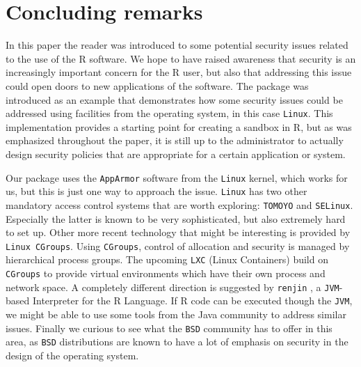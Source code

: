 \documentclass[article]{jss}
\newcommand{\R}{\textsf{R}\xspace}
\newcommand{\Java}{\textsf{Java}\xspace}
\newcommand{\AppArmor}{\texttt{AppArmor}\xspace}
\newcommand{\RAppArmor}{\pkg{RAppArmor}\xspace}
\newcommand{\Linux}{\texttt{Linux}\xspace}
\begin{document}
\section{Concluding remarks}

In this paper the reader was introduced to some potential security issues
related to the use of the \R software. We hope to have raised
awareness that security is an increasingly important concern for the
\R user, but also that addressing this issue could open doors to new
applications of the software. The \RAppArmor package was introduced as an
example that demonstrates how some security issues could be addressed using
facilities from the operating system, in this case \Linux. This
implementation provides a starting point for creating a sandbox in \R,
but as was emphasized throughout the paper, it is still up to the administrator
to actually design security policies that are appropriate for a certain
application or system.

Our package uses the \AppArmor software from the \Linux kernel,
which works for us, but this is just one way to approach the issue.
\Linux has two other mandatory access control systems that are worth
exploring: \texttt{TOMOYO} and \texttt{SELinux}. Especially the latter is known
to be very sophisticated, but also extremely hard to set up. Other more recent
technology that might be interesting is provided by \texttt{Linux CGroups}.
Using \texttt{CGroups}, control of allocation and security is managed by
hierarchical process groups. The upcoming \texttt{LXC} (Linux Containers) build
on \texttt{CGroups} to provide virtual environments which have their own
process and network space. A completely different direction is suggested by
\texttt{renjin} \citep{renjin}, a \texttt{JVM}-based Interpreter for the R
Language. If \R code can be executed though the \texttt{JVM}, we might be able
to use some tools from the \Java community to address similar issues.
Finally we curious to see what the \texttt{BSD} community has to offer in this
area, as \texttt{BSD} distributions are known to have a lot of emphasis on
security in the design of the operating system.
\end{document}
